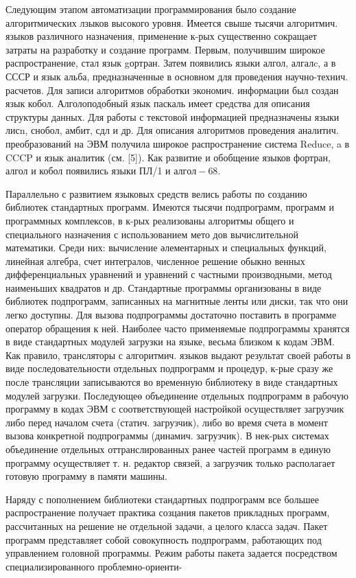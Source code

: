 \documentclass[10pt]{article}
\begin{document}
Следующим этапом автоматизации программирования было создание алгоритмических лзыков высокого уровня. Имеется свыше тысячи алгоритмич. языков различного назначения, применение к-рых существенно сокращает затраты на разработку и создание программ. Первым, получившим широкое распространение, стал язык gортран. Затем появились языки алгол, алгалc, а в СССР и язык альба, предназначенные в основном для проведения научно-технич. расчетов. Для записи алгоритмов обработки экономич. информации был создан язык кобол. Алголоподобный язык паскаль имеет средства для описания структуры данных. Для работы с текстовой информацией предназначены языки лисn, снобол, амбит, сдл и др. Для описания алгоритмов проведения аналитич. преобразований на ЭВМ получила широкое распространение система Reduce, a в CCCP и язык аналитик (см. [5]). Как развитие и обобщение языков фортран, алгол и кобол появились языки ПЛ/1 и $а л г о л-68$.



Параллельно с развитием языковых средств велись работы по созданию библиотек стандартных программ. Имеются тысячи подпрограмм, программ и программных комплексов, в к-рых реализованы алгоритмы общего и специального назначения с использованием мето дов вычислительной математики. Среди них: вычисление әлементарных и специальных функций, линейная алгебра, счет интегралов, численное решение обыкно венных дифференциальных уравнений и уравнений с частными производными, метод наименьших квадратов и др. Стандартные программы организованы в виде библиотек подпрограмм, записанных на магнитные ленты или диски, так что они легко доступны. Для вызова подпрограммы достаточно поставить в программе оператор обращения к ней. Наиболее часто применяемые подпрограммы хранятся в виде стандартных модулей загрузки на языке, весьма близком к кодам ЭВМ. Как правило, трансляторы с алгоритмич. языков выдают результат своей работы в виде последовательности отдельных подпрограмм и процедур, к-рые сразу же после трансляции записываются во временную библиотеку в виде стандартных модулей загрузки. Последующеө объединение отдельных подпрограмм в рабочую программу в кодах ЭВМ с соответствующей настройкой осуществляет загрузчик либо перед началом счета (статич. загрузчик), либо во время счета в момент вызова конкретной подпрограммы (динамич. загрузчик). В нек-рых системах объединение отдельных оттранслированных ранее частей программ в единую программу осуществляет т. н. редактор связей, а загрузчик только располагает готовую программу в памяти машины.



Наряду с пополнением библиотеки стандартных подпрограмм все большее распространение получает практика созцания пакетов прикладных программ, рассчитанных на решение не отдельной задачи, а целого класса задач. Пакет программ представляет собой совокупность подпрограмм, работающих под управлением головной программы. Режим работы пакета задается посредством специализированного проблемно-ориенти-
\end{document}
